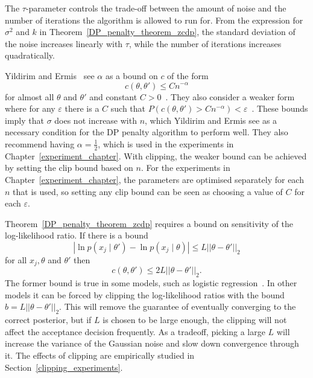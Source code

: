 \documentclass[english,twoside,openright]{HYgraduMLDS}
\begin{document}
The \(\tau\)-parameter controls the trade-off between the amount of noise
and the number of iterations the algorithm is allowed to run for. From the
expression for \(\sigma^{2}\) and \(k\) in Theorem~\ref{DP_penalty_theorem_zcdp},
the standard deviation of the noise increases linearly with \(\tau\), while
the number of iterations increases quadratically.

Yildirim and Ermis~\cite{YildirimE19} see \(\alpha\) as a bound on \(c\) of the
form
\[
  c(\theta, \theta') \leq Cn^{-\alpha}
\]
for almost all \(\theta\) and \(\theta'\) and constant
\(C > 0\)~\cite[Assumption A1]{YildirimE19}.
They also consider a weaker form where for any \(\varepsilon\) there is
a \(C\) such that
\(P(c(\theta, \theta') > Cn^{-\alpha}) < \varepsilon\)~\cite[Assumption A4]{YildirimE19}.
These bounds imply that \(\sigma\)
does not increase with \(n\), which Yildirim and Ermis see as a necessary
condition for the DP penalty algorithm to perform well. They also recommend
having \(\alpha = \frac{1}{2}\), which is used in the experiments in
Chapter~\ref{experiment_chapter}.
With clipping, the weaker bound can be achieved by setting the clip bound based
on \(n\). For the experiments
in Chapter~\ref{experiment_chapter}, the parameters are optimised separately
for each \(n\) that is used, so setting any clip bound can be seen as
choosing a value of \(C\) for each \(\varepsilon\).


Theorem~\ref{DP_penalty_theorem_zcdp}
requires a bound on sensitivity of the log-likelihood ratio. If there is a bound
\[
    |\ln p(x_j\mid \theta') - \ln p(x_j\mid \theta)| \leq L||\theta - \theta'||_2
\]
for all \(x_j, \theta\) and \(\theta'\) then
\[
    c(\theta, \theta') \leq 2L||\theta - \theta'||_2.
\]
The former bound is true in some models, such as logistic
regression~\cite{YildirimE19}. In other
models it can be forced by clipping the log-likelihood ratios with the bound
\(b = L||\theta - \theta'||_{2}\). This will remove the
guarantee of eventually converging to the correct posterior, but if \(L\) is
chosen to be large enough, the clipping will not affect the
acceptance decision frequently. As a tradeoff, picking a large \(L\) will increase
the variance of the Gaussian noise and slow down convergence through it.
The effects of clipping are empirically studied in
Section~\ref{clipping_experiments}.
\end{document}
